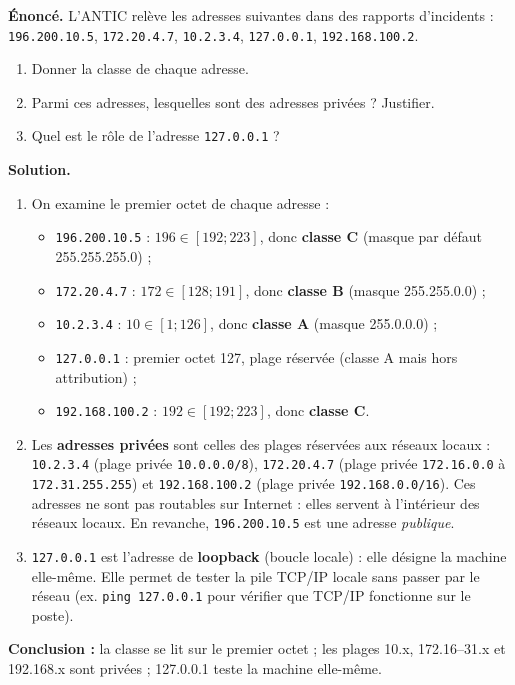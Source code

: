 \documentclass[11pt]{article}
\begin{document}
\begin{exoresolu}
\textbf{Énoncé.} L'ANTIC relève les adresses suivantes dans des rapports d'incidents : \texttt{196.200.10.5}, \texttt{172.20.4.7}, \texttt{10.2.3.4}, \texttt{127.0.0.1}, \texttt{192.168.100.2}.
\begin{enumerate}
\item Donner la classe de chaque adresse.
\item Parmi ces adresses, lesquelles sont des adresses privées ? Justifier.
\item Quel est le rôle de l'adresse \texttt{127.0.0.1} ?
\end{enumerate}
\tcblower
\textbf{Solution.}
\begin{enumerate}
\item On examine le premier octet de chaque adresse :
\begin{itemize}
\item \texttt{196.200.10.5} : $196 \in [192;223]$, donc \textbf{classe C} (masque par défaut 255.255.255.0) ;
\item \texttt{172.20.4.7} : $172 \in [128;191]$, donc \textbf{classe B} (masque 255.255.0.0) ;
\item \texttt{10.2.3.4} : $10 \in [1;126]$, donc \textbf{classe A} (masque 255.0.0.0) ;
\item \texttt{127.0.0.1} : premier octet 127, plage réservée (classe A mais hors attribution) ;
\item \texttt{192.168.100.2} : $192 \in [192;223]$, donc \textbf{classe C}.
\end{itemize}
\item Les \textbf{adresses privées} sont celles des plages réservées aux réseaux locaux : \texttt{10.2.3.4} (plage privée \texttt{10.0.0.0/8}), \texttt{172.20.4.7} (plage privée \texttt{172.16.0.0} à \texttt{172.31.255.255}) et \texttt{192.168.100.2} (plage privée \texttt{192.168.0.0/16}). Ces adresses ne sont pas routables sur Internet : elles servent à l'intérieur des réseaux locaux. En revanche, \texttt{196.200.10.5} est une adresse \emph{publique}.
\item \texttt{127.0.0.1} est l'adresse de \textbf{loopback} (boucle locale) : elle désigne la machine elle-même. Elle permet de tester la pile TCP/IP locale sans passer par le réseau (ex. \texttt{ping 127.0.0.1} pour vérifier que TCP/IP fonctionne sur le poste).
\end{enumerate}
\textbf{Conclusion :} la classe se lit sur le premier octet ; les plages 10.x, 172.16--31.x et 192.168.x sont privées ; 127.0.0.1 teste la machine elle-même.
\end{exoresolu}
\end{document}
